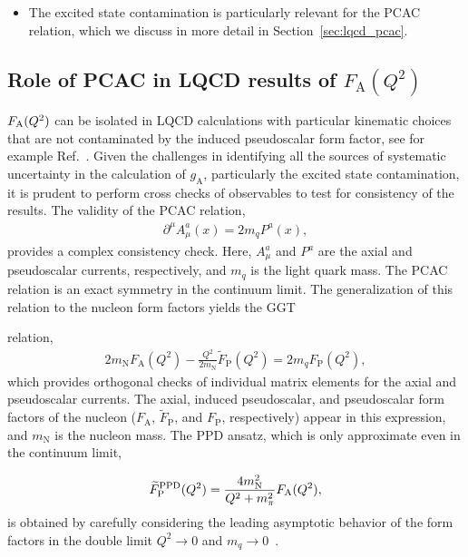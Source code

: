 \documentclass{ar-1col}
\begin{document}
\begin{itemize}[leftmargin=*]
\item The excited state contamination is particularly relevant for the PCAC relation, which we discuss in more detail in Section~\ref{sec:lqcd_pcac}.


\end{itemize}


\subsection{Role of PCAC in LQCD results of $F_{\mathrm{A}}(Q^2)$\label{sec:lqcd_pcac}}

$F_{\rm A}(Q^2)$ can be isolated in LQCD calculations with particular kinematic choices that are not contaminated by the induced pseudoscalar form factor, see for example Ref.~\cite{Gupta:2017dwj}.
Given the challenges in identifying all the sources of systematic uncertainty in the calculation of $g_{\mathrm{A}}$, particularly the excited state contamination, it is prudent to perform cross checks of observables to test for consistency of the results.
The validity of the PCAC relation,
\begin{align}
 \partial^\mu A^{a}_{\mu}(x) = 2 m_q P^{a}(x),
 \label{eq:pcac}
\end{align}
provides a complex consistency check.
Here, $A^{a}_\mu$ and $P^{a}$ are the axial and pseudoscalar currents,
 respectively, and $m_q$ is the light quark mass.
The PCAC relation is an exact symmetry in the continuum limit.
The generalization of this relation to the nucleon form factors
 yields the GGT%
 \begin{marginnote}
 \end{marginnote}%
 relation,
\begin{align}
 2 m_{\mathrm{N}} F_{\mathrm{A}}(Q^2) -\frac{Q^2}{2m_{\mathrm{N}}} \widetilde{F}_{\mathrm{P}}(Q^2) = 2 m_q F_{\mathrm{P}}(Q^2),
 \label{eq:ggt}
\end{align}
 which provides orthogonal checks of individual matrix elements
 for the axial and pseudoscalar currents.
The axial, induced pseudoscalar, and pseudoscalar form factors of the nucleon
 ($F_{\mathrm{A}}$, $\widetilde{F}_{\mathrm{P}}$, and $F_{\mathrm{P}}$, respectively) appear in this expression,
 and $m_{\mathrm{N}}$ is the nucleon mass.
The PPD ansatz, which is only approximate even in the continuum limit,%
\begin{marginnote}
 \end{marginnote}%
\begin{align}
 \widetilde{F}^{\rm PPD}_{\mathrm{P}}(Q^2) = \frac{4m_{\mathrm{N}}^2}{Q^2+m_\pi^2} F_{\mathrm{A}}(Q^2),
 \label{eq:ppd}
\end{align}
is obtained
 by carefully considering the leading asymptotic behavior of the
 form factors in the double limit $Q^2\to0$ and $m_q\to0$~\cite{Sasaki:2007gw}.
\end{document}
